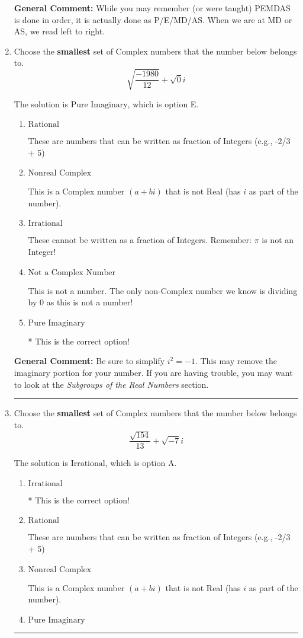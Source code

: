 \documentclass{extbook}[14pt]
\newcommand{\litem}[1]{\item #1

\rule{\textwidth}{0.4pt}}
\begin{document}
\begin{enumerate}
{\textbf{General Comment:} While you may remember (or were taught) PEMDAS is done in order, it is actually done as P/E/MD/AS. When we are at MD or AS, we read left to right.
}
\litem{
Choose the \textbf{smallest} set of Complex numbers that the number below belongs to.
\[ \sqrt{\frac{-1980}{12}}+\sqrt{0}i \]

The solution is \( \text{Pure Imaginary} \), which is option E.\begin{enumerate}[label=\Alph*.]
\item \( \text{Rational} \)

These are numbers that can be written as fraction of Integers (e.g., -2/3 + 5)
\item \( \text{Nonreal Complex} \)

This is a Complex number $(a+bi)$ that is not Real (has $i$ as part of the number).
\item \( \text{Irrational} \)

These cannot be written as a fraction of Integers. Remember: $\pi$ is not an Integer!
\item \( \text{Not a Complex Number} \)

This is not a number. The only non-Complex number we know is dividing by 0 as this is not a number!
\item \( \text{Pure Imaginary} \)

* This is the correct option!
\end{enumerate}

\textbf{General Comment:} Be sure to simplify $i^2 = -1$. This may remove the imaginary portion for your number. If you are having trouble, you may want to look at the \textit{Subgroups of the Real Numbers} section.
}
\litem{
Choose the \textbf{smallest} set of Complex numbers that the number below belongs to.
\[ \frac{\sqrt{154}}{13}+\sqrt{-7}i \]

The solution is \( \text{Irrational} \), which is option A.\begin{enumerate}[label=\Alph*.]
\item \( \text{Irrational} \)

* This is the correct option!
\item \( \text{Rational} \)

These are numbers that can be written as fraction of Integers (e.g., -2/3 + 5)
\item \( \text{Nonreal Complex} \)

This is a Complex number $(a+bi)$ that is not Real (has $i$ as part of the number).
\item \( \text{Pure Imaginary} \)


\end{enumerate}}
\end{enumerate}
\end{document}

